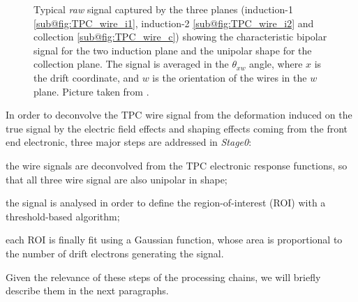 \begin{figure}
    \centering
    \caption[TPC plane signal]{Typical \emph{raw} signal captured by the three planes (induction-1 \ref{sub@fig:TPC_wire_i1}, induction-2 \ref{sub@fig:TPC_wire_i2} and collection \ref{sub@fig:TPC_wire_c}) showing the characteristic bipolar signal for the two induction plane and the unipolar shape for the collection plane. The signal is averaged in the $\theta_{xw}$ angle, where $x$ is the drift coordinate, and $w$ is the orientation of the wires in the $w$ plane. Picture taken from \cite{ICARUS:2024hmk}. }
    \label{fig:TPC_signal}
\end{figure}

In order to deconvolve the TPC wire signal from the deformation induced on the true signal by the electric field effects and shaping effects coming from the front end electronic, three major steps are addressed in \emph{Stage0}: \begin{inparaenum}
    \item the wire signals are deconvolved from the TPC electronic response functions, so that all three wire signal are also unipolar in shape;
    \item the signal is analysed in order to define the region-of-interest (ROI) with a threshold-based algorithm; 
    \item each ROI is finally fit using a Gaussian function, whose area is proportional to the number of drift electrons generating the signal. 
\end{inparaenum} Given the relevance of these steps of the processing chains, we will briefly describe them in the next paragraphs.

